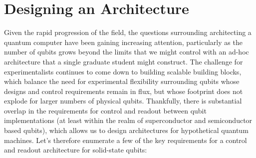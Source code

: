 \section{Designing an Architecture}
\label{sec:archdesign}
Given the rapid progression of the field, the questions surrounding architecting a quantum computer have been gaining increasing attention,
particularly as the number of qubits grows beyond the limits that we might control with an ad-hoc architecture that a single graduate student might construct.
The challenge for experimentalists continues to come down to building scalable building blocks, which balance the need for experimental
flexibility surrounding qubits whose designs and control requirements remain in flux, but whose footprint does not explode for larger numbers
of physical qubits. Thankfully, there is substantial overlap in the requirements for control and readout between qubit implementations
(at least within the realm of superconductor and semiconductor based qubits), which allows us to design architectures for hypothetical
quantum machines. Let's therefore enumerate a few of the key requirements for a control and readout architecture for solid-state qubits:
